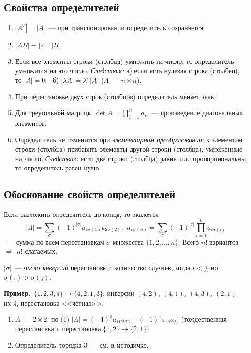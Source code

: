 \documentclass[a4paper,11pt]{article}
\newcommand{\prim}{\textbf{Пример.}\ }
\begin{document}
\subsection{Свойства определителей}
\begin{enumerate}[label=\arabic*)]
\item $|A^T|=|A|$~--- при транспонировании определитель сохраняется.
\item $|AB|=|A|\cdot|B|$.
\item Если все элементы строки (столбца) умножить на число, то определитель умножится на это число.
\emph{Следствия:} а) если есть нулевая строка (столбец), то $|A|=0$; \ б) $|\lambda A|=\lambda^n|A|$
($A$~--- $n\times n$).
\item При перестановке двух строк (столбцов) определитель меняет знак.
\item Для треугольной матрицы $\det A=\prod_{i=1}^{n}a_{ii}$~--- произведение диагональных элементов.
\item Определитель не изменится при \emph{элементарном преобразовании}: к элементам строки (столбца)
прибавить элементы другой строки (столбца), умноженные на число.
\emph{Следствие:} если две строки (столбца) равны или пропорциональны, то определитель равен нулю.
\end{enumerate}

\subsection{Обоснование свойств определителей}
Если разложить определитель до конца, то окажется
\[
|A|=\sum_{\sigma}(-1)^{|\sigma|}a_{1\sigma(1)}a_{2\sigma(2)}\dots a_{n\sigma(n)}
=\sum_{\sigma}(-1)^{|\sigma|}\prod_{i=1}^{n}a_{i\sigma(i)}\tag{1}
\]
~--- сумма по всем перестановкам $\sigma$ множества $\{1,2,\dots,n\}$. Всего $n!$ вариантов
$\Rightarrow$ $n!$ слагаемых.

$|\sigma|$~--- \emph{число инверсий} перестановки: количество случаев, когда $i<j$, но $\sigma(i)>\sigma(j)$.

\prim $\{1,2,3,4\}\to\{4,2,1,3\}$: инверсии $(4,2),\ (4,1),\ (4,3),\ (2,1)$~--- их 4, перестановка
<<чётная>>.

\begin{enumerate}[label=\arabic*.]
\item $A$~--- $2\times2$: по (1) $|A|=(-1)^0a_{11}a_{22}+(-1)^1a_{12}a_{21}$ (тождественная
перестановка и перестановка $\{1,2\}\to\{2,1\}$).
\item Определитель порядка 3~--- см. в методичке.
\end{enumerate}
\end{document}
